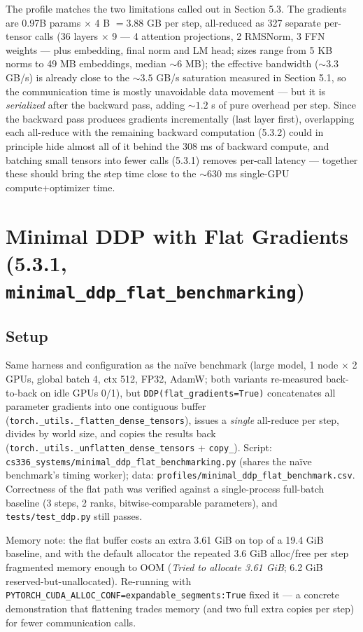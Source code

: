 \documentclass[11pt]{article}
\newcommand{\code}[1]{\texttt{#1}}
\begin{document}
The profile matches the two limitations called out in Section 5.3. The gradients are 0.97B params
$\times$ 4 B $= 3.88$ GB per step, all-reduced as 327 separate per-tensor calls (36 layers
$\times$ 9 --- 4 attention projections, 2 RMSNorm, 3 FFN weights --- plus embedding, final norm
and LM head; sizes range from 5 KB norms to 49 MB embeddings, median ${\sim}6$ MB); the
effective bandwidth (${\sim}3.3$ GB/s) is already close to the ${\sim}3.5$ GB/s saturation measured
in Section 5.1, so the communication time is mostly unavoidable data movement --- but it is
\emph{serialized} after the backward pass, adding ${\sim}1.2$ s of pure overhead per step. Since the
backward pass produces gradients incrementally (last layer first), overlapping each all-reduce with
the remaining backward computation (5.3.2) could in principle hide almost all of it behind the
308 ms of backward compute, and batching small tensors into fewer calls (5.3.1) removes per-call
latency --- together these should bring the step time close to the ${\sim}630$ ms single-GPU
compute+optimizer time.

\section{Minimal DDP with Flat Gradients (5.3.1, \texttt{minimal\_ddp\_flat\_benchmarking})}

\subsection{Setup}

Same harness and configuration as the na\"ive benchmark (large model, 1 node $\times$ 2 GPUs,
global batch 4, ctx 512, FP32, AdamW; both variants re-measured back-to-back on idle GPUs 0/1),
but \code{DDP(flat\_gradients=True)} concatenates all parameter gradients into one contiguous
buffer (\code{torch.\_utils.\_flatten\_dense\_tensors}), issues a \emph{single} all-reduce per
step, divides by world size, and copies the results back
(\code{torch.\_utils.\_unflatten\_dense\_tensors} + \code{copy\_}). Script:
\code{cs336\_systems/minimal\_ddp\_flat\_benchmarking.py} (shares the na\"ive benchmark's timing
worker); data: \code{profiles/minimal\_ddp\_flat\_benchmark.csv}. Correctness of the flat path was
verified against a single-process full-batch baseline (3 steps, 2 ranks, bitwise-comparable
parameters), and \code{tests/test\_ddp.py} still passes.

Memory note: the flat buffer costs an extra 3.61 GiB on top of a 19.4 GiB baseline, and with the
default allocator the repeated 3.6 GiB alloc/free per step fragmented memory enough to OOM
(\emph{Tried to allocate 3.61 GiB}; 6.2 GiB reserved-but-unallocated). Re-running with
\code{PYTORCH\_CUDA\_ALLOC\_CONF=expandable\_segments:True} fixed it --- a concrete demonstration
that flattening trades memory (and two full extra copies per step) for fewer communication calls.
\end{document}

